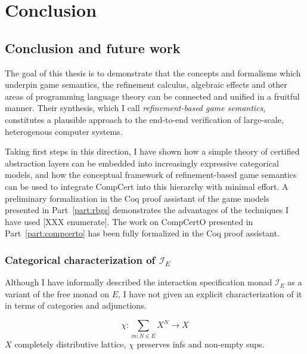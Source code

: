 \documentclass[11pt,oneside,draft]{book}
\theoremstyle{definition}
\begin{document}



\part{Conclusion}

\chapter{Conclusion and future work} %

The goal of this thesis is to demonstrate that
the concepts and formalisms which underpin
game semantics,
the refinement calculus,
algebraic effects and 
other areas of programming language theory
can be connected and unified in a fruitful manner.
Their synthesis,
which I call \emph{refinement-based game semantics},
constitutes
a plausible approach to the end-to-end verification
of large-scale, heterogenous computer systems.

Taking first steps in this direction,
I have shown how a simple theory of certified abstraction layers
can be embedded into increasingly expressive categorical models,
and how the conceptual framework of refinement-based game semantics
can be used to integrate CompCert into this hierarchy
with minimal effort.
A preliminary formalization in the Coq proof assistant
of the game models presented in Part~\ref{part:rbgs}
demonstrates the advantages of the techniques I have used
[XXX enumerate].
The work on CompCertO presented in Part~\ref{part:compcerto}
has been fully formalized in the Coq proof assistant.

\section{Categorical characterization of $\mathcal{I}_E$}

Although I have informally described
the interaction specification monad $\mathcal{I}_E$
as a variant of the free monad on $E$,
I have not given an explicit characterization of it
in terms of categories and adjunctions.

\[
  \chi : \sum_{m:N \in E} X^N \rightarrow X
\]
$X$ completely distributive lattice,
$\chi$ preserves infs and non-empty sups.
\end{document}
